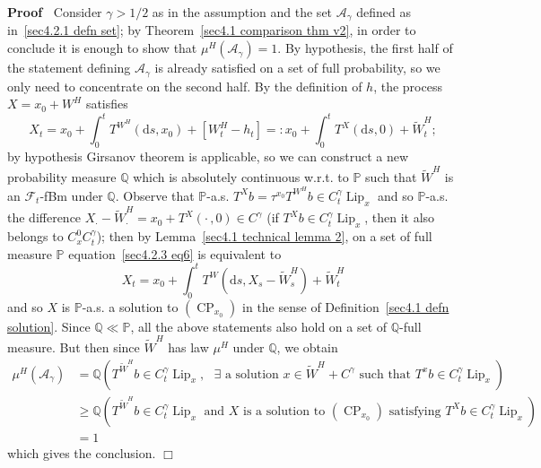 \documentclass[10pt]{article}
\newcommand{\backassign}{=:}
\newcommand{\mathd}{\mathrm{d}}
\newcommand{\tmop}[1]{\ensuremath{\operatorname{#1}}}
\newenvironment{proof}{\noindent\textbf{Proof\ }}{\hspace*{\fill}$\Box$\medskip}
\begin{document}
\begin{proof}
  Consider $\gamma > 1 / 2$ as in the assumption and the set
  $\mathcal{A}_{\gamma}$ defined as in~{\eqref{sec4.2.1 defn set}}; by
  Theorem~\ref{sec4.1 comparison thm v2}, in order to conclude it is enough to
  show that $\mu^H (\mathcal{A}_{\gamma}) = 1$. By hypothesis, the first half
  of the statement defining $\mathcal{A}_{\gamma}$ is already satisfied on a
  set of full probability, so we only need to concentrate on the second half.
  By the definition of $h$, the process $X = x_0 + W^H$ satisfies
  \begin{equation}
    X_t = x_0 + \int_0^t T^{W^H} (\mathd s, x_0) + [W^H_t - h_t] \backassign
    x_0 + \int_0^t T^X (\mathd s, 0) + \tilde{W}^H_t ; \label{sec4.2.3 eq6}
  \end{equation}
  by hypothesis Girsanov theorem is applicable, so we can construct a new
  probability measure $\mathbb{Q}$ which is absolutely continuous w.r.t. to
  $\mathbb{P}$ such that $\tilde{W}^H$ is an $\mathcal{F}_t$\mbox{-}fBm under
  $\mathbb{Q}$. Observe that $\mathbb{P}$\mbox{-}a.s. $T^X b = \tau^{x_0}
  T^{W^H} b \in C^{\gamma}_t \tmop{Lip}_x$ and so $\mathbb{P}$-a.s. the
  difference $X_{\cdot} - \tilde{W}^H_{\cdot} = x_0 + T^X \left( \cdot \,, 0
  \right) \in C^{\gamma}$ (if $T^X b \in C^{\gamma}_t \tmop{Lip}_x$, then it
  also belongs to $C^0_x C^{\gamma}_t$); then by Lemma~\ref{sec4.1 technical
  lemma 2}, on a set of full measure $\mathbb{P}$ equation~{\eqref{sec4.2.3
  eq6}} is equivalent to
  \[ X_t = x_0 + \int_0^t T^W (\mathd s, X_s - \tilde{W}_s^H) + \tilde{W}^H_t
  \]
  and so $X$ is $\mathbb{P}$\mbox{-}a.s. a solution to $(\tmop{CP}_{x_0})$ in
  the sense of Definition~\ref{sec4.1 defn solution}. Since $\mathbb{Q} \ll
  \mathbb{P}$, all the above statements also hold on a set of
  $\mathbb{Q}$\mbox{-}full measure. But then since $\tilde{W}^H$ has law
  $\mu^H$ under $\mathbb{Q}$, we obtain
  \begin{align*}
    \mu^H (\mathcal{A}_{\gamma}) & = \mathbb{Q} \left( T^{\tilde{W}^H} b \in
    C^{\gamma}_t \tmop{Lip}_x, \text{ $\exists$ a solution } x \in
    \tilde{W}^H + C^{\gamma} \text{ such that } T^x b \in C^{\gamma}_t
    \tmop{Lip}_x \right)\\
    & \geqslant \mathbb{Q} \left( T^{\tilde{W}^H} b \in C^{\gamma}_t
    \tmop{Lip}_x \text{ and $X$ is a solution to $(\tmop{CP}_{x_0})$ satisfying } T^X b \in C^{\gamma}_t \tmop{Lip}_x \right)\\
    & = 1
  \end{align*}
  which gives the conclusion.
\end{proof}
\end{document}

